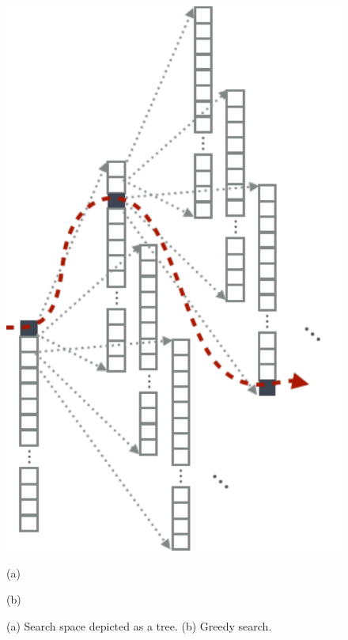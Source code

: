 \documentclass{report}
\begin{document}
\begin{figure}[t]
\begin{minipage}{0.48\textwidth}
        \includegraphics[width=0.98\columnwidth]{figures/greedy_search.pdf}
    \end{minipage}

    \vspace{3mm}

    \begin{minipage}{0.48\textwidth}
        \centering
        (a)
    \end{minipage}
    \hfill
    \begin{minipage}{0.48\textwidth}
        \centering
        (b)
    \end{minipage}
    \caption{(a) Search space depicted as a tree. (b) Greedy search.}
    \label{fig:searchspace}
\end{figure}
\end{document}
